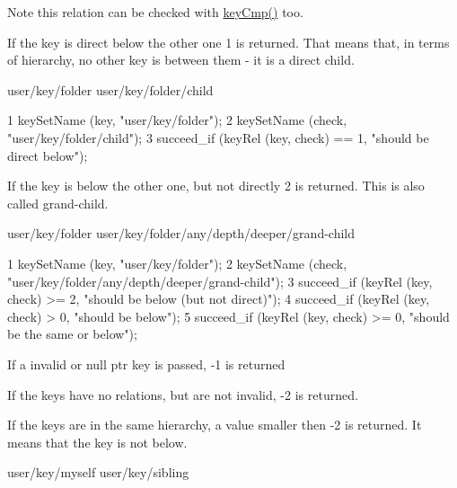 \begin{DoxyNote}{Note}
this relation can be checked with \hyperlink{group__keytest_gaf6e66e12fe04d535a5d1c8218ced803e}{key\+Cmp()} too.
\end{DoxyNote}

\begin{DoxyItemize}
\item If the key is direct below the other one 1 is returned. That means that, in terms of hierarchy, no other key is between them -\/ it is a direct child. \begin{DoxyVerb}user/key/folder
user/key/folder/child
\end{DoxyVerb}

\end{DoxyItemize}


\begin{DoxyCode}
1 keySetName (key, "user/key/folder");
2 keySetName (check, "user/key/folder/child");
3 succeed\_if (keyRel (key, check) == 1, "should be direct below");
\end{DoxyCode}



\begin{DoxyItemize}
\item If the key is below the other one, but not directly 2 is returned. This is also called grand-\/child. \begin{DoxyVerb}user/key/folder
user/key/folder/any/depth/deeper/grand-child
\end{DoxyVerb}

\end{DoxyItemize}


\begin{DoxyCode}
1 keySetName (key, "user/key/folder");
2 keySetName (check, "user/key/folder/any/depth/deeper/grand-child");
3 succeed\_if (keyRel (key, check) >= 2, "should be below (but not direct)");
4 succeed\_if (keyRel (key, check) > 0, "should be below");
5 succeed\_if (keyRel (key, check) >= 0, "should be the same or below");
\end{DoxyCode}



\begin{DoxyItemize}
\item If a invalid or null ptr key is passed, -\/1 is returned
\item If the keys have no relations, but are not invalid, -\/2 is returned.
\item If the keys are in the same hierarchy, a value smaller then -\/2 is returned. It means that the key is not below. \begin{DoxyVerb}user/key/myself
user/key/sibling
\end{DoxyVerb}

\end{DoxyItemize}


